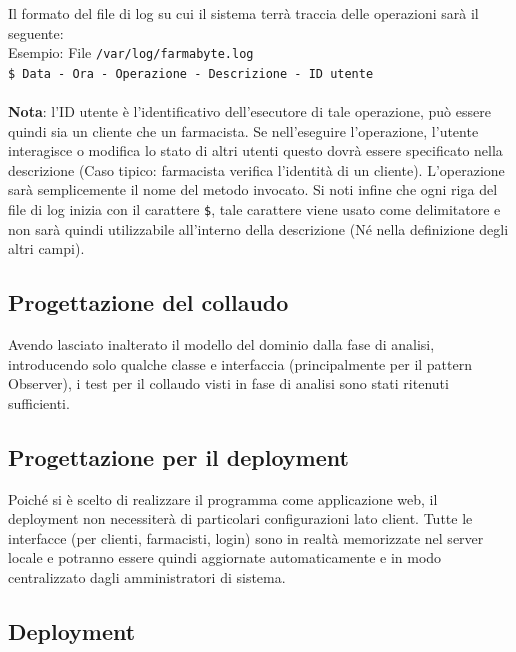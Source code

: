 Il formato del file di log su cui il sistema terrà traccia delle operazioni
sarà il seguente:\\

Esempio: File \texttt{/var/log/farmabyte.log}\\

\texttt{\$ Data - Ora - Operazione - Descrizione - ID utente}\\ \\
\textbf{Nota}: l'ID utente è l'identificativo dell'esecutore di tale operazione, può essere quindi sia un cliente che un farmacista.
Se nell'eseguire l'operazione, l'utente interagisce o modifica lo stato di altri utenti questo dovrà essere specificato nella descrizione (Caso tipico: farmacista verifica l'identità di un cliente).
L'operazione sarà semplicemente il nome del metodo invocato. 
Si noti infine che ogni riga del file di log inizia con il carattere \texttt{\$}, tale carattere viene usato come delimitatore e non sarà quindi utilizzabile all'interno della descrizione (Né nella definizione degli altri campi).

\newpage

\subsection{Progettazione del collaudo}

Avendo lasciato inalterato il modello del dominio dalla fase di analisi, introducendo solo qualche classe e interfaccia (principalmente per il pattern Observer), 
i test per il collaudo visti in fase di analisi sono stati ritenuti sufficienti.

\vspace{2em}

\subsection{Progettazione per il deployment}

Poiché si è scelto di realizzare il programma come applicazione web, il deployment non necessiterà di particolari configurazioni lato client.
Tutte le interfacce (per clienti, farmacisti, login) sono in realtà memorizzate nel server locale e potranno essere quindi aggiornate automaticamente e in modo centralizzato dagli amministratori di sistema. 

\newpage

\subsection{Deployment}


